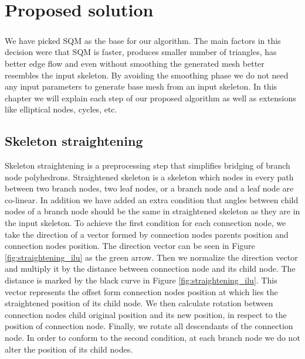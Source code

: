 \chapter{Proposed solution}\label{ch:proposed_solution}
\paragraph{}
We have picked SQM as the base for our algorithm. The main factors in this decision were that SQM is faster, produces smaller number of triangles, has better edge flow and even without smoothing the generated mesh better resembles the input skeleton. By avoiding the smoothing phase we do not need any input parameters to generate base mesh from an input skeleton. In this chapter we will explain each step of our proposed algorithm as well as extensions like elliptical nodes, cycles, etc.

\section{Skeleton straightening}\label{sec:straight}
Skeleton straightening is a preprocessing step that simplifies bridging of branch node polyhedrons. Straightened skeleton is a skeleton which nodes in every path between two branch nodes, two leaf nodes, or a branch node and a leaf node are co-linear. In addition we have added an extra condition that angles between child nodes of a branch node should be the same in straightened skeleton as they are in the input skeleton. To achieve the first condition for each connection node, we take the direction of a vector formed by connection nodes parents position and connection nodes position. The direction vector can be seen in Figure \ref{fig:straightening_ilu} as the green arrow. Then we normalize the direction vector and multiply it by the distance between connection node and its child node. The distance is marked by the black curve in Figure \ref{fig:straightening_ilu}. This vector represents the offset form connection nodes position at which lies the straightened position of its child node. We then calculate rotation between connection nodes child original position and its new position, in respect to the position of connection node. Finally, we rotate all descendants of the connection node. In order to conform to the second condition, at each branch node we do not alter the position of its child nodes.

